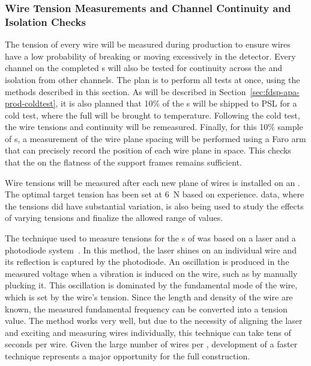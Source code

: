 \subsubsection{Wire Tension Measurements and Channel Continuity and Isolation Checks}
\label{sec:fdsp-apa-prod-qa-tension}

The tension of every wire will be measured during production to ensure wires have a low probability of breaking or moving excessively in the detector.  Every channel on the completed s will also be tested for continuity across the  and isolation from other channels.  The plan is to perform all tests at once, using the methods described in this section.  As will be described in Section~\ref{sec:fdsp-apa-prod-coldtest}, it is also planned that 10$\%$ of the s will be shipped to PSL for a cold test, where the full  will be brought to  temperature. Following the cold test, the wire tensions and continuity will be remeasured.  Finally, for this 10$\%$ sample of s, a measurement of the wire plane spacing will be performed using a Faro arm that can precisely record the position of each wire plane in space. This checks that the  on the flatness of the support frames remains sufficient.  

Wire tensions will be measured after each new plane of wires is installed on an . The optimal target tension has been set at \SI{6}{N} based on  experience.   data, where the tensions did have substantial variation, is also being used to study the effects of varying tensions and finalize the allowed range of values.  


The technique  
used to measure tensions for the s of  was based on a laser and a photodiode system~\cite{Acciarri:2016ugk}. In this method, the laser shines on an individual wire and its reflection is captured by the photodiode. An oscillation is produced in the measured voltage when a vibration is induced on the wire, such as by manually plucking it. This oscillation is dominated by the fundamental mode of the wire, which is set by the wire's tension. Since the length and density of the wire are known, the measured fundamental frequency can be converted into a tension value. The method works very well, but due to the necessity of aligning the laser and exciting and measuring wires individually, this technique can take tens of seconds per wire. Given the large number of wires per , development of a faster technique represents a major opportunity for the full  construction.

